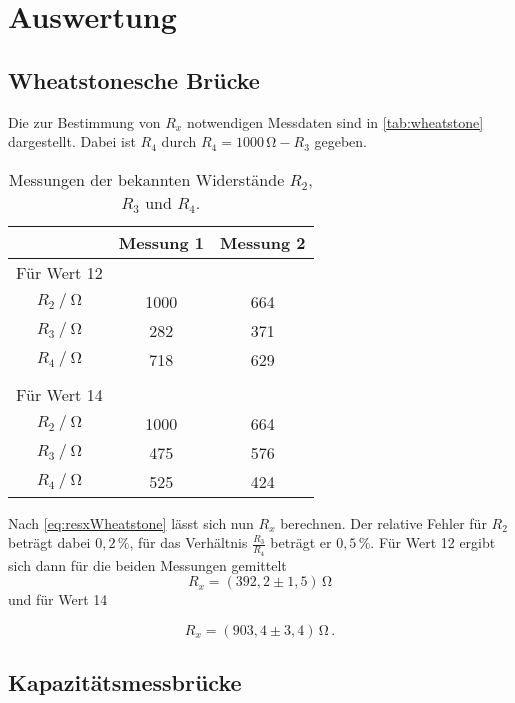 \section{Auswertung}
\label{sec:Auswertung}

\subsection{Wheatstonesche Brücke}

Die zur Bestimmung von $R_x$ notwendigen Messdaten sind in \autoref{tab:wheatstone} dargestellt.
Dabei ist $R_4$ durch $R_4 = 1000 \,\unit{\ohm} - R_3$ gegeben.

\begin{table}[H]
  \centering
  \caption{Messungen der bekannten Widerstände $R_2$, $R_3$ und $R_4$.}
  \label{tab:wheatstone}
  \begin{tabular}{S S S}
    \toprule
    & {Messung 1} & {Messung 2} \\
    \midrule
    {Für Wert 12} \\
    {$R_2 \mathbin{/} \unit{\ohm}$} & 1000 & 664 \\
    {$R_3 \mathbin{/} \unit{\ohm}$} &  282 & 371 \\
    {$R_4 \mathbin{/} \unit{\ohm}$} &  718 & 629 \\
    \\
    {Für Wert 14} \\ 
    {$R_2 \mathbin{/} \unit{\ohm}$} & 1000 & 664\\
    {$R_3 \mathbin{/} \unit{\ohm}$} &  475 & 576\\
    {$R_4 \mathbin{/} \unit{\ohm}$} &  525 & 424\\
    \bottomrule
  \end{tabular}
\end{table}

Nach \eqref{eq:resxWheatstone} lässt sich nun $R_x$ berechnen. 
Der relative Fehler für $R_2$ beträgt dabei $0,2 \,\%$, für das Verhältnis $\frac{R_3}{R_4}$ beträgt er $0,5 \,\%$.
Für Wert 12 ergibt sich dann für die beiden Messungen gemittelt
\begin{equation*}
  R_x =(392,2 \pm 1,5) \,\unit{\ohm}
\end{equation*} und für Wert 14

\begin{equation*}
  R_x = (903,4 \pm 3,4) \,\unit{\ohm} \,.
\end{equation*}

\newpage

\subsection{Kapazitätsmessbrücke}

